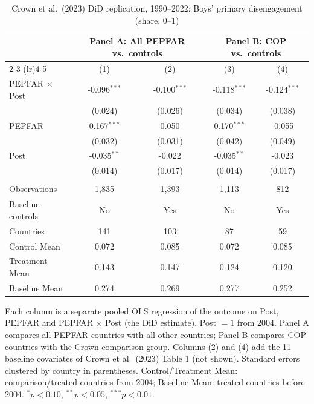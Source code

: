 
\begin{table}[htbp]
   \caption{\label{tab:crown_did_prim_disengage_boys} Crown et al.\ (2023) DiD replication, 1990--2022: Boys' primary disengagement (share, 0--1)}
   \bigskip
   \centering
   \begin{tabular}{lcccc}
      \toprule
       & \multicolumn{2}{c}{Panel A: All PEPFAR vs.\ controls} & \multicolumn{2}{c}{Panel B: COP vs.\ controls} \\ \cmidrule(lr){2-3} \cmidrule(lr){4-5}
                            & (1)            & (2)            & (3)            & (4)\\  
      \midrule 
      PEPFAR $\times$ Post  & -0.096$^{***}$ & -0.100$^{***}$ & -0.118$^{***}$ & -0.124$^{***}$\\   
                            & (0.024)        & (0.026)        & (0.034)        & (0.038)\\   
      PEPFAR                & 0.167$^{***}$  & 0.050          & 0.170$^{***}$  & -0.055\\   
                            & (0.032)        & (0.031)        & (0.042)        & (0.049)\\   
      Post                  & -0.035$^{**}$  & -0.022         & -0.035$^{**}$  & -0.023\\   
                            & (0.014)        & (0.017)        & (0.014)        & (0.017)\\   
       \\
      Observations          & 1,835          & 1,393          & 1,113          & 812\\  
      Baseline controls     & No             & Yes            & No             & Yes\\  
      Countries             & 141            & 103            & 87             & 59\\  
      Control Mean          & 0.072          & 0.085          & 0.072          & 0.085\\  
      Treatment Mean        & 0.143          & 0.147          & 0.124          & 0.120\\  
      Baseline Mean         & 0.274          & 0.269          & 0.277          & 0.252\\  
      \bottomrule
   \end{tabular}
   
   \par \raggedright 
   Each column is a separate pooled OLS regression of the outcome on Post, PEPFAR and PEPFAR $\times$ Post (the DiD estimate). Post $= 1$ from 2004. Panel A compares all PEPFAR countries with all other countries; Panel B compares COP countries with the Crown comparison group. Columns (2) and (4) add the 11 baseline covariates of Crown et al.\ (2023) Table 1 (not shown). Standard errors clustered by country in parentheses. Control/Treatment Mean: comparison/treated countries from 2004; Baseline Mean: treated countries before 2004. $^{*}p<0.10$, $^{**}p<0.05$, $^{***}p<0.01$.
\end{table}


